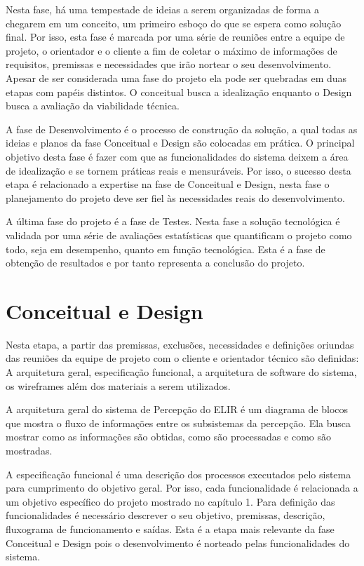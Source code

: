 Nesta fase, há uma tempestade de ideias a serem organizadas de forma a chegarem em um conceito, um primeiro esboço do que se espera como solução final. Por isso, esta fase é marcada por uma série de reuniões entre a equipe de projeto, o orientador e o cliente a fim de coletar o máximo de informações de requisitos, premissas e necessidades que irão nortear o seu desenvolvimento. Apesar de ser considerada uma fase do projeto ela pode ser quebradas em duas etapas com papéis distintos. O conceitual busca a idealização enquanto o Design busca a avaliação da viabilidade técnica.

A fase de Desenvolvimento é o processo de construção da solução, a qual todas as ideias e planos da fase Conceitual e Design são colocadas em prática. O principal objetivo desta fase é fazer com que as funcionalidades do sistema deixem a área de idealização e se tornem práticas reais e mensuráveis. Por isso, o sucesso desta etapa é relacionado a expertise na fase de Conceitual e Design, nesta fase o planejamento do projeto deve ser fiel às necessidades reais do desenvolvimento.

A última fase do projeto é a fase de Testes. Nesta fase a solução tecnológica é validada por uma série de avaliações estatísticas que quantificam o projeto como todo, seja em desempenho, quanto em função tecnológica.  Esta é a fase de obtenção de resultados e por tanto representa a conclusão do projeto.


\section{Conceitual e Design}
Nesta etapa, a partir das premissas, exclusões, necessidades e definições oriundas das reuniões da equipe de projeto com o cliente e orientador técnico são definidas: A arquitetura geral, especificação funcional,  a arquitetura de software do sistema, os wireframes além dos materiais a serem utilizados.

A arquitetura geral do sistema de Percepção do ELIR é um diagrama de blocos que mostra o fluxo de informações entre os subsistemas da percepção. Ela busca mostrar como as informações são obtidas, como são processadas e como são mostradas. 

A especificação funcional é uma descrição dos processos executados pelo sistema para cumprimento do objetivo geral. Por isso, cada funcionalidade é relacionada a um objetivo específico do projeto mostrado no capítulo 1. Para definição das funcionalidades é necessário descrever o seu objetivo, premissas, descrição, fluxograma de funcionamento e saídas. Esta é a etapa mais relevante da fase Conceitual e Design pois o desenvolvimento é norteado pelas funcionalidades do sistema. 

